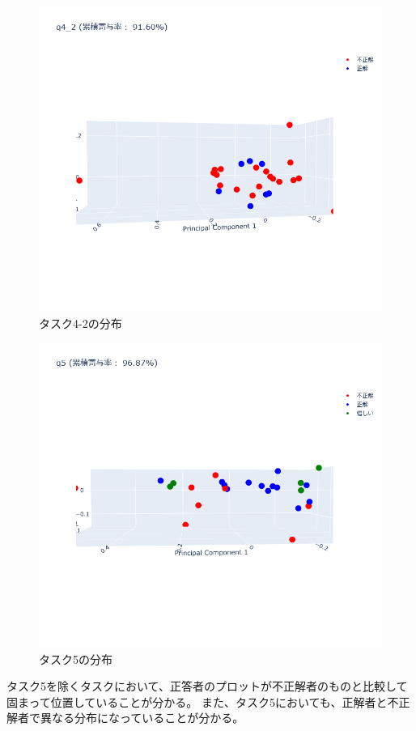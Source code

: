 \documentclass[paper=a4paper,fontsize=11pt]{jlreq}
\begin{document}
    \begin{figure}[htbp]
      \centering
      \includegraphics[width=0.8\linewidth]{3dplot_q4_2.png}
      \caption{タスク4-2の分布}
    \end{figure}
    \FloatBarrier
    \begin{figure}[htbp]
      \centering
      \includegraphics[width=0.8\linewidth]{3dplot_q5.png}
      \caption{タスク5の分布}
    \end{figure}
    \FloatBarrier

    タスク5を除くタスクにおいて、正答者のプロットが不正解者のものと比較して固まって位置していることが分かる。
    また、タスク5においても、正解者と不正解者で異なる分布になっていることが分かる。

\clearpage
\end{document}
